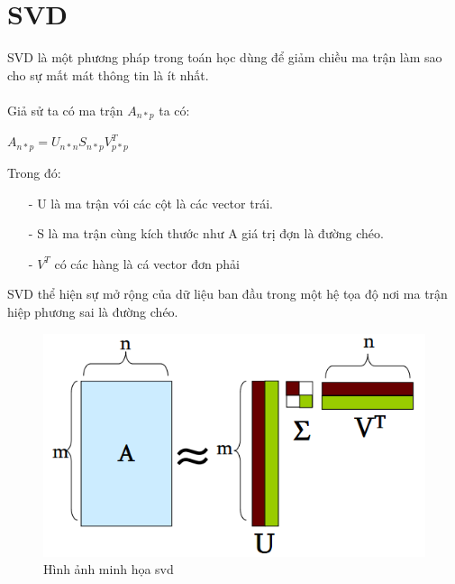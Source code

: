 \documentclass[a4paper,11pt]{report}
\begin{document}
\section{SVD}
SVD là một phương pháp trong toán học dùng để giảm chiều ma trận làm sao cho sự mất mát thông tin là ít nhất. \\  \\
Giả sử ta có ma trận $A_{n*p}$ ta có:
\begin{center}
\huge{
$A_{n*p} = U_{n*n}S_{n*p}V^{T}_{p*p}$
}
\end{center}
Trong đó:
\begin{itemize}
\item[-] U là ma trận vói các cột là các vector trái.
\item[-] S là ma trận cùng kích thước như A giá trị đợn là đường chéo.
\item[-] $V^T$ có các hàng là cá vector đơn phải 
\end{itemize}
SVD thể hiện sự mở rộng của dữ liệu ban đầu trong một hệ tọa độ nơi ma trận hiệp phương sai là đường chéo.
\begin{figure}[h]
\begin{center}
\includegraphics[scale=0.8]{svd.png}
\end{center}
\caption{Hình ảnh minh họa svd}
\end{figure}
\end{document}
